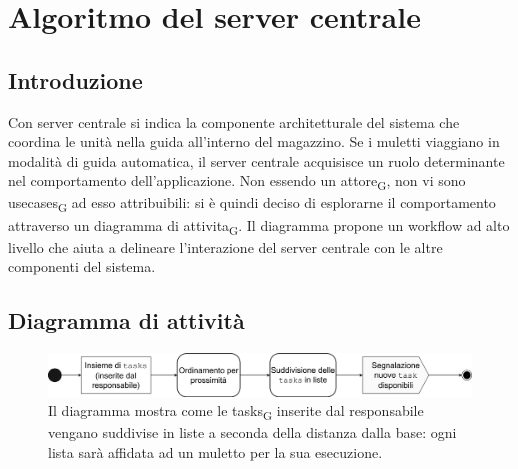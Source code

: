 \section{Algoritmo del server centrale}
\subsection{Introduzione}
Con server centrale si indica la componente architetturale del sistema che coordina le unità nella guida all'interno del magazzino. Se i muletti viaggiano in modalità di guida automatica, il server centrale acquisisce un ruolo determinante nel comportamento dell'applicazione. Non essendo un \gls{attore}\textsubscript{G}, non vi sono \glspl{usecase}\textsubscript{G} ad esso attribuibili: si è quindi deciso di esplorarne il comportamento attraverso un diagramma di \gls{attivita}\textsubscript{G}. Il diagramma propone un workflow ad alto livello che aiuta a delineare l'interazione del server centrale con le altre componenti del sistema.



\subsection{Diagramma di attività}

\begin{figure}[H]
	\centering
	\includegraphics[scale=0.35]{res/images/diagramma_di_attivita3.png}
	\caption[Diagramma di \gls{attivita}\textsubscript{G} per l'ordinamento  delle tasks]{Il diagramma mostra come le \glspl{task}\textsubscript{G} inserite dal responsabile vengano suddivise in liste a seconda della distanza dalla base: ogni lista sarà affidata ad un muletto per la sua esecuzione.}
\end{figure}

